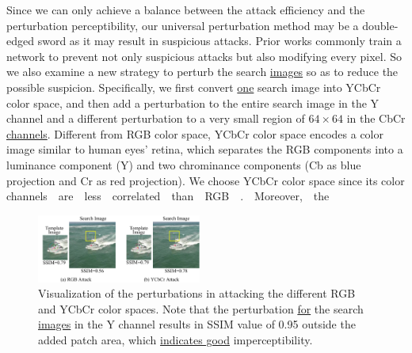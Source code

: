 \documentclass[journal]{IEEEtran}
\begin{document}
Since we can only achieve a balance between the attack efficiency and the perturbation perceptibility, our universal perturbation method may be a double-edged sword as it may result in suspicious attacks. Prior works commonly train a network to prevent not only suspicious attacks but also modifying every pixel. So we also examine a new strategy to perturb the search \uline{images} so as to reduce the possible suspicion. Specifically, we first convert \uline{one} search image into YCbCr color space, and then add a perturbation to the entire search image in the Y channel and a different perturbation to a very small region of $64\times64$ in the CbCr \uline{channels}. Different from RGB color space, YCbCr color space encodes a color image similar to human eyes’ retina, which separates the RGB components into a luminance component (Y) and two chrominance components (Cb as blue projection and Cr as red projection). We choose YCbCr color space since its color
channels~~are~~less~~correlated~~than~~RGB~~\cite{8630918}.~~Moreover,~~the
\begin{figure}[t]
  \centering
  \includegraphics[width=0.48\textwidth]{images_imperceptible/1.pdf}
  \caption{Visualization of the perturbations in attacking the different RGB and YCbCr color spaces. Note that the perturbation \uline{for} the search \uline{images} in the Y channel results in SSIM value of 0.95 outside the added patch area, which \uline{indicates good} imperceptibility.}
  \label{fig:YCbCr}
\end{figure}
\end{document}
